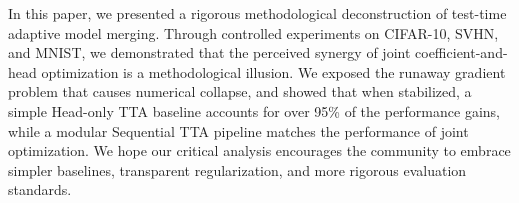\documentclass{article}
\theoremstyle{plain}
\theoremstyle{definition}
\theoremstyle{remark}
\begin{document}
In this paper, we presented a rigorous methodological deconstruction of test-time adaptive model merging. Through controlled experiments on CIFAR-10, SVHN, and MNIST, we demonstrated that the perceived synergy of joint coefficient-and-head optimization is a methodological illusion. We exposed the runaway gradient problem that causes numerical collapse, and showed that when stabilized, a simple Head-only TTA baseline accounts for over 95\% of the performance gains, while a modular Sequential TTA pipeline matches the performance of joint optimization. We hope our critical analysis encourages the community to embrace simpler baselines, transparent regularization, and more rigorous evaluation standards.



\end{document}
